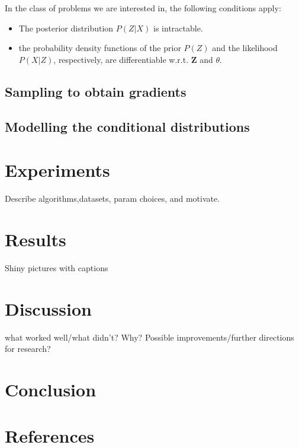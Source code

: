 \documentclass{article}
\begin{document}
In the class of problems we are interested in, the following conditions apply:
\begin{itemize}
\item The posterior distribution $P(Z|X)$ is intractable. 
\item the probability density functions of the prior $P(Z)$ and the likelihood $P(X|Z)$, respectively, are differentiable w.r.t. $\mathbf{Z}$ and $\theta$. 
\end{itemize}

\subsection*{Sampling to obtain gradients}



\subsection*{Modelling the conditional distributions}

\section*{Experiments}

Describe algorithms,datasets, param choices, and motivate.

\section*{Results}

Shiny pictures with captions

\section*{Discussion}

what worked well/what didn't? Why? Possible improvements/further directions for research?

\section*{Conclusion}



\section*{References}
\end{document}
